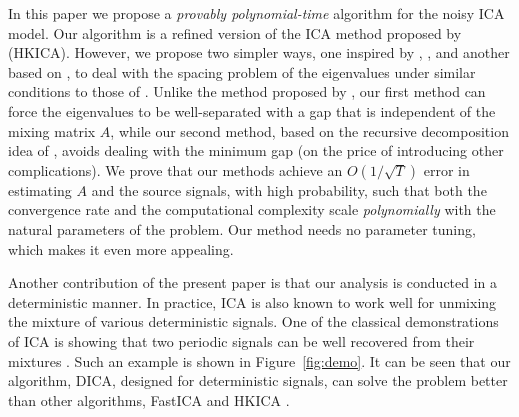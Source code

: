 \documentclass{article}
\theoremstyle{definition}
\begin{document}
In this paper we propose a \emph{provably polynomial-time} algorithm for the noisy ICA model.
Our algorithm is a refined version of the ICA method proposed by \cite{hsu2013learning} (HKICA). 
However, we propose two simpler ways, one inspired by \citet{frieze1996learning}, \citet{arora2012provable}, and another based on \citet{vempala2014max}, to deal with the spacing problem of the eigenvalues under similar conditions to those of \citet{goyal2014fourier}.
Unlike the method proposed by \citet{goyal2014fourier}, our first method can force the eigenvalues to be well-separated with a gap that is independent of the mixing matrix $A$, while our second method, based on the recursive decomposition idea of \citet{vempala2014max}, avoids dealing with the minimum gap (on the price of introducing other complications).
We prove that our methods achieve an $O(1/\sqrt{T})$ error in estimating $A$ and the source signals, with high probability, such that both the convergence rate and the computational complexity scale \emph{polynomially} with the natural parameters of the problem. %
Our method needs no parameter tuning, which makes it even more appealing. %


Another contribution of the present paper is that our analysis is conducted in a deterministic manner. 
In practice, ICA is also known to work well for unmixing the mixture of various deterministic signals. 
One of the classical demonstrations of ICA is showing that two periodic signals can be well recovered from their mixtures \citep{HyvOja00}.
Such an example is shown in Figure~\ref{fig:demo}. It can be seen that our algorithm, DICA, designed for deterministic signals, can solve the problem better than
other algorithms, FastICA \citep{hyvarinen1999fast} and HKICA \citep{hsu2013learning}.
\end{document}
